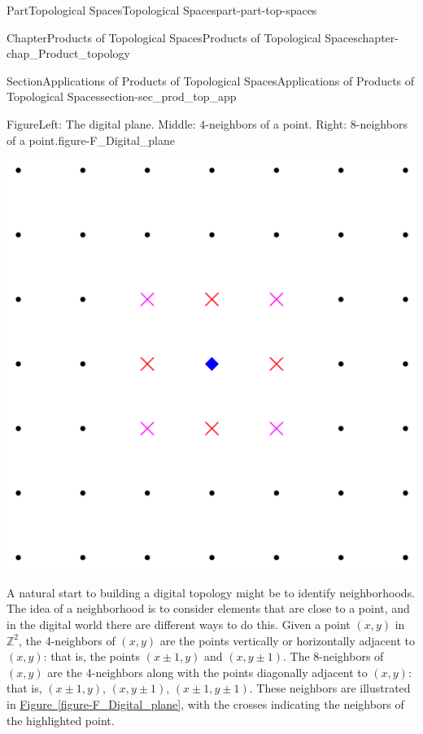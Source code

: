 \documentclass[oneside,10pt,]{book}
\newcommand{\xreffont}{\relax}
\numberwithin{equation}{chapter}
\newcommand{\Z}{\mathbb{Z}}
\begin{document}
\begin{partptx}{Part}{Topological Spaces}{}{Topological Spaces}{}{}{part-part-top-spaces}
\begin{chapterptx}{Chapter}{Products of Topological Spaces}{}{Products of Topological Spaces}{}{}{chapter-chap_Product_topology}
\begin{sectionptx}{Section}{Applications of Products of Topological Spaces}{}{Applications of Products of Topological Spaces}{}{}{section-sec_prod_top_app}
\begin{figureptx}{Figure}{Left: The digital plane. Middle: \(4\)-neighbors of a point. Right: \(8\)-neighbors of a point.}{figure-F_Digital_plane}{}
\begin{sidebyside}{3}{0.0166666666666667}{0.0166666666666667}{0.0333333333333333}
\begin{sbspanel}{0.3}
\includegraphics[width=\linewidth]{external/neighbors_8.pdf}
\end{sbspanel}%
\end{sidebyside}%
\tcblower
\end{figureptx}%
A natural start to building a digital topology might be to identify neighborhoods. The idea of a neighborhood is to consider elements that are close to a point, and in the digital world there are different ways to do this. Given a point \((x,y)\) in \(\Z^2\), the 4-neighbors of \((x,y)\) are the points vertically or horizontally adjacent to \((x,y)\): that is, the points \((x \pm 1, y)\) and \((x, y \pm 1)\). The 8-neighbors of \((x,y)\) are the 4-neighbors along with the points diagonally adjacent to \((x,y)\): that is, \((x \pm 1, y)\), \((x, y \pm 1)\), \((x \pm 1, y \pm 1)\). These neighbors are illustrated in \hyperref[figure-F_Digital_plane]{Figure~{\xreffont\ref{figure-F_Digital_plane}}}, with the crosses indicating the neighbors of the highlighted point.%
\par

\end{sectionptx}
\end{chapterptx}
\end{partptx}
\end{document}
